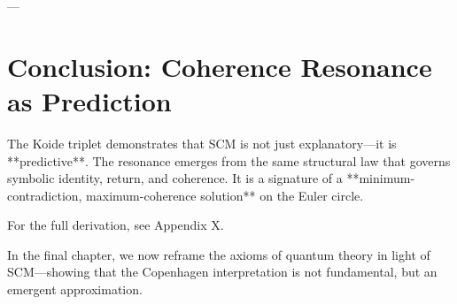 ---

\section{Conclusion: Coherence Resonance as Prediction}

The Koide triplet demonstrates that SCM is not just explanatory—it is **predictive**. The resonance emerges from the same structural law that governs symbolic identity, return, and coherence. It is a signature of a **minimum-contradiction, maximum-coherence solution** on the Euler circle.

For the full derivation, see Appendix X.

In the final chapter, we now reframe the axioms of quantum theory in light of SCM—showing that the Copenhagen interpretation is not fundamental, but an emergent approximation.
